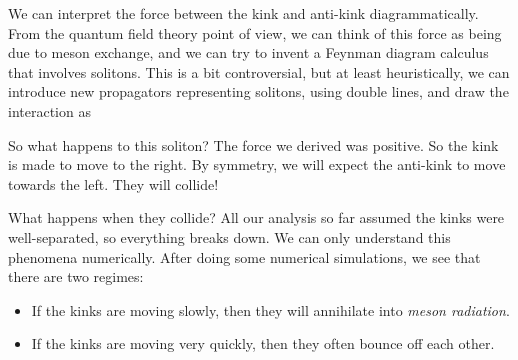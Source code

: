 \documentclass[a4paper]{article}
\begin{document}
We can interpret the force between the kink and anti-kink diagrammatically. From the quantum field theory point of view, we can think of this force as being due to meson exchange, and we can try to invent a Feynman diagram calculus that involves solitons. This is a bit controversial, but at least heuristically, we can introduce new propagators representing solitons, using double lines, and draw the interaction as
\begin{center}
\end{center}
%

So what happens to this soliton? The force we derived was positive. So the kink is made to move to the right. By symmetry, we will expect the anti-kink to move towards the left. They will collide!

What happens when they collide? All our analysis so far assumed the kinks were well-separated, so everything breaks down. We can only understand this phenomena numerically. After doing some numerical simulations, we see that there are two regimes:
\begin{itemize}
  \item If the kinks are moving slowly, then they will annihilate into \emph{meson radiation}.
  \item If the kinks are moving very quickly, then they often bounce off each other.
\end{itemize}
%
\end{document}
